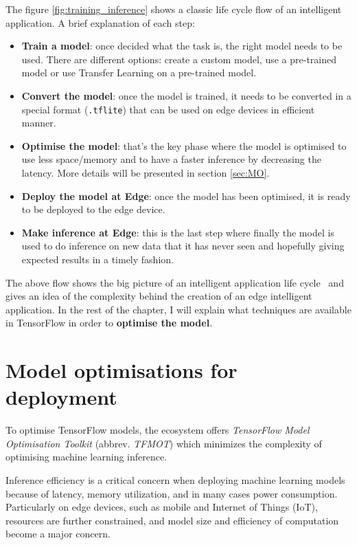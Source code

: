 The figure \autoref{fig:training_inference} shows a classic life cycle flow of
an intelligent application. A brief explanation of each step:

\begin{itemize}
    \item \textbf{Train a model}: once decided what the task is, the right
        model needs to be used. There are different options: create a custom
        model, use a pre-trained model or use Transfer Learning on a
        pre-trained model.
    \item \textbf{Convert the model}: once the model is trained, it needs to be
        converted in a special format (\texttt{.tflite}) that can be used on
        edge devices in efficient manner.
    \item \textbf{Optimise the model}: that's the key phase where the model is
        optimised to use less space/memory and to have a faster inference by
        decreasing the latency. More details will be presented in section
        \autoref{sec:MO}.
    \item \textbf{Deploy the model at Edge}: once the model has been optimised,
        it is ready to be deployed to the edge device.
    \item \textbf{Make inference at Edge}: this is the last step where finally
        the model is used to do inference on new data that it has never seen
        and hopefully giving expected results in a timely fashion.
\end{itemize}

The above flow shows the big picture of an intelligent application life
cycle~\cite{tflite:intro} and gives an idea of the complexity behind the
creation of an edge intelligent application.
In the rest of the chapter, I will explain what techniques are available in
TensorFlow in order to \textbf{optimise the model}.

\section{Model optimisations for deployment}\label{sec:MO}

To optimise TensorFlow models, the ecosystem offers \textit{TensorFlow Model
Optimisation Toolkit} (abbrev. \textit{TFMOT}) which minimizes the complexity
of optimising machine learning inference.

Inference efficiency is a critical concern when deploying machine learning
models because of latency, memory utilization, and in many cases power
consumption. Particularly on edge devices, such as mobile and Internet of
Things (IoT), resources are further constrained, and model size and efficiency
of computation become a major concern.

